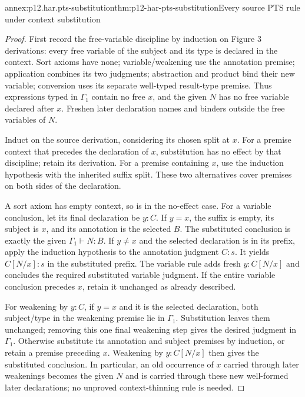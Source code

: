 \begin{annexitem}{annex:p12.har.pts-substitution}{thm:p12-har-pts-substitution}{Every source PTS rule under context substitution}
\begin{proof}
First record the free-variable discipline by induction on Figure 3
derivations: every free variable of the subject and its type is declared
in the context. Sort axioms have none; variable/weakening use the
annotation premise; application combines its two judgments; abstraction
and product bind their new variable; conversion uses its separate
well-typed result-type premise. Thus expressions typed in
\(\Gamma_1\) contain no free \(x\), and the given \(N\)
has no free variable declared after \(x\). Freshen later declaration
names and binders outside the free variables of \(N\).

Induct on the source derivation, considering its chosen split at \(x\).
For a premise context that precedes the declaration of \(x\),
substitution has no effect by that discipline; retain its derivation.
For a premise containing \(x\), use the induction hypothesis with
the inherited suffix split. These two alternatives cover premises on
both sides of the declaration.

A sort axiom has empty context, so is in the no-effect case. For a
variable conclusion, let its final declaration be \(y:C\).
If \(y=x\), the suffix is empty, its subject is \(x\), and
its annotation is the selected \(B\). The substituted conclusion
is exactly the given \(\Gamma_1\vdash N:B\).
If \(y\ne x\) and the selected declaration is in its prefix,
apply the induction hypothesis to the annotation judgment
\(C:s\). It yields \(C[N/x]:s\) in the substituted prefix.
The variable rule adds fresh \(y:C[N/x]\) and concludes the
required substituted variable judgment. If the entire variable
conclusion precedes \(x\), retain it unchanged as already described.

For weakening by \(y:C\), if \(y=x\) and it is the selected
declaration, both subject/type in the weakening premise lie in
\(\Gamma_1\). Substitution leaves them unchanged; removing this
one final weakening step gives the desired judgment in \(\Gamma_1\).
Otherwise substitute its annotation and subject premises by induction,
or retain a premise preceding \(x\). Weakening by
\(y:C[N/x]\) then gives the substituted conclusion. In particular,
an old occurrence of \(x\) carried through later weakenings becomes
the given \(N\) and is carried through these new well-formed later
declarations; no unproved context-thinning rule is needed.


\end{proof}
\end{annexitem}

